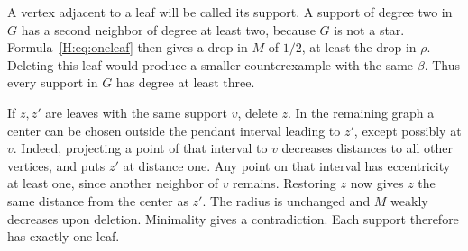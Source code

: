 \documentclass[11pt,a4paper]{article}
\theoremstyle{remark}\newtheorem{remark}[theorem]{Remark}
\numberwithin{equation}{section}
\begin{document}
A vertex adjacent to a leaf will be called its support. A support of
degree two in $G$ has a second neighbor of degree at least two, because
$G$ is not a star. Formula~\eqref{H:eq:oneleaf} then gives a drop in
$M$ of $1/2$, at least the drop in $\rho$. Deleting this leaf would
produce a smaller counterexample with the same $\beta$. Thus every
support in $G$ has degree at least three.

If $z,z'$ are leaves with the same support $v$, delete $z$. In the
remaining graph a center can be chosen outside the pendant interval
leading to $z'$, except possibly at $v$. Indeed, projecting a point
of that interval to $v$ decreases distances to all other vertices,
and puts $z'$ at distance one. Any point on that interval has
eccentricity at least one, since another neighbor of $v$ remains.
Restoring $z$ now gives $z$ the same distance from the center as $z'$.
The radius is unchanged and $M$ weakly decreases upon deletion.
Minimality gives a contradiction. Each support therefore has exactly
one leaf.
\end{document}
